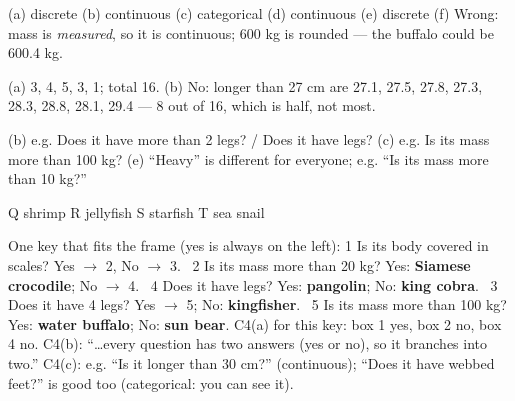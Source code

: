\documentclass[12pt,a4paper]{article}
\begin{document}
\smallskip
{}

\noindent (a) discrete \quad (b) continuous \quad (c) categorical \quad (d) continuous
\quad (e) discrete \quad (f) Wrong: mass is \emph{measured}, so it is continuous; 600 kg
is rounded --- the buffalo could be 600.4 kg.

\smallskip
{}

\noindent (a) 3, 4, 5, 3, 1; total 16. \quad (b) No: longer than 27 cm are 27.1, 27.5, 27.8, 27.3, 28.3, 28.8, 28.1, 29.4 --- 8 out
of 16, which is half, not most.

\smallskip
{}

\noindent (b) e.g. Does it have more than 2 legs? / Does it have legs? \quad
(c) e.g. Is its mass more than 100 kg? \quad
(e) ``Heavy'' is different for everyone; e.g. ``Is its mass more than 10 kg?''

\smallskip
{}

\noindent Q shrimp \quad R jellyfish \quad S starfish \quad T sea snail

\smallskip
{}

\noindent One key that fits the frame (yes is always on the left):
1 Is its body covered in scales? Yes $\to$ 2, No $\to$ 3. \
2 Is its mass more than 20 kg? Yes: \textbf{Siamese crocodile}; No $\to$ 4. \
4 Does it have legs? Yes: \textbf{pangolin}; No: \textbf{king cobra}. \
3 Does it have 4 legs? Yes $\to$ 5; No: \textbf{kingfisher}. \
5 Is its mass more than 100 kg? Yes: \textbf{water buffalo}; No: \textbf{sun bear}.
\quad C4(a) for this key: box 1 yes, box 2 no, box 4 no. \quad C4(b): ``\ldots every
question has two answers (yes or no), so it branches into two.'' \quad C4(c): e.g. ``Is it longer
than 30 cm?'' (continuous); ``Does it have webbed feet?'' is good too (categorical: you
can see it).
\end{document}
